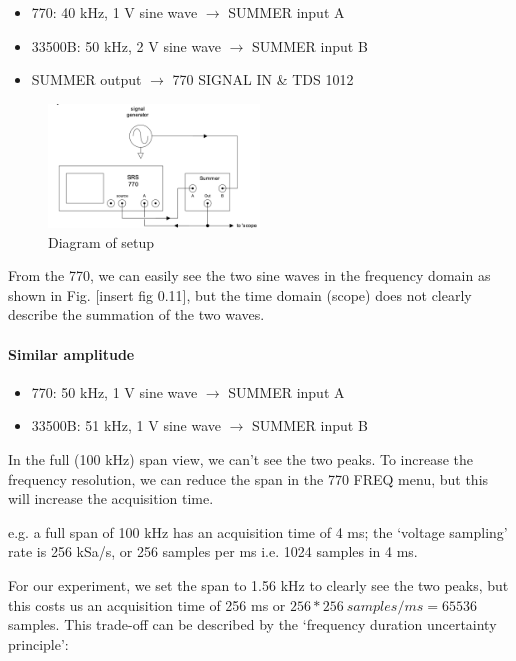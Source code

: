 \documentclass[../main.tex]{subfiles}
\begin{document}
\begin{itemize}
    \item 770: 40 kHz, 1 V sine wave $\to$ SUMMER input A
    \item 33500B: 50 kHz, 2 V sine wave $\to$ SUMMER input B
    \item SUMMER output $\to$ 770 SIGNAL IN \& TDS 1012
\end{itemize}

\begin{figure} [ht]
    \centering
    \includegraphics[width=0.5\textwidth]{fig1.png}
    \caption{Diagram of setup}
\end{figure}

From the 770, we can easily see the two sine waves in the frequency domain as shown in Fig. [insert fig 0.11],
but the time domain (scope) does not clearly describe the summation of the two waves.

\paragraph*{Similar amplitude}
\begin{itemize}
    \item 770: 50 kHz, 1 V sine wave $\to$ SUMMER input A
    \item 33500B: 51 kHz, 1 V sine wave $\to$ SUMMER input B
\end{itemize}

In the full (100 kHz) span view, we can't see the two peaks.
To increase the frequency resolution, we can reduce the span in the 770 FREQ menu, 
but this will increase the acquisition time. 

e.g. a full span of 100 kHz has an acquisition time of 4 ms;
the `voltage sampling' rate is 256 kSa/s, or 256 samples per ms i.e. 1024 samples in 4 ms.

For our experiment, we set the span to 1.56 kHz to clearly see the two peaks, but this costs us
an acquisition time of 256 ms or $256 * \qty{256}{samples/ms} = 65536$ samples. This trade-off can be described by
the `frequency duration uncertainty principle':
\end{document}
